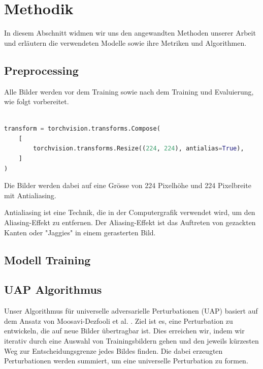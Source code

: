 \section{Methodik}

In diesem Abschnitt widmen wir uns den angewandten Methoden unserer Arbeit und erläutern die verwendeten Modelle sowie ihre Metriken und Algorithmen.

\subsection{Preprocessing}

Alle Bilder werden vor dem Training sowie nach dem Training und Evaluierung, wie folgt vorbereitet. \\

\begin{mdframed}
\begin{lstlisting}[language=python, label={ImagePreprocessor}, caption={Image Preprocessing}]

transform = torchvision.transforms.Compose(
    [
        torchvision.transforms.Resize((224, 224), antialias=True),
    ]
)

\end{lstlisting}
\label{code:preprocessing der Bilder}
\end{mdframed}

Die Bilder werden dabei auf eine Grösse von 224 Pixelhöhe und 224 Pixelbreite mit Antialiasing. 

Antialiasing ist eine Technik, die in der Computergrafik verwendet wird, um den Aliasing-Effekt zu entfernen. Der Aliasing-Effekt ist das Auftreten von gezackten Kanten oder "Jaggies" in einem gerasterten Bild.

\subsection{Modell Training}



\newpage
\subsection{UAP Algorithmus}

Unser Algorithmus für universelle adversarielle Perturbationen (UAP) basiert auf dem Ansatz von Moosavi-Dezfooli et al. \cite{moosavi-dezfooli_universal_2017}. Ziel ist es, eine Perturbation zu entwickeln, die auf neue Bilder übertragbar ist. Dies erreichen wir, indem wir iterativ durch eine Auswahl von Trainingsbildern gehen und den jeweils kürzesten Weg zur Entscheidungsgrenze jedes Bildes finden. Die dabei erzeugten Perturbationen werden summiert, um eine universelle Perturbation zu formen. 

